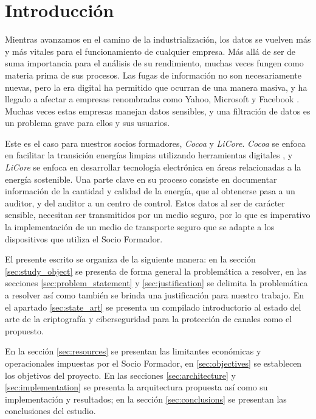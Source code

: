 \documentclass{article}
\begin{document}
    \section{Introducción}

        Mientras avanzamos en el camino de la industrialización, los datos se vuelven más y más vitales para el funcionamiento de cualquier empresa. Más allá de ser de suma importancia para el análisis de su rendimiento, muchas veces fungen como materia prima de sus procesos. Las fugas de información no son necesariamente nuevas, pero la era digital ha permitido que ocurran de una manera masiva, y ha llegado a afectar a empresas renombradas como Yahoo, Microsoft y Facebook \cite{data_breach_biggest}. Muchas veces estas empresas manejan datos sensibles, y una filtración de datos es un problema grave para ellos y sus usuarios.

        Este es el caso para nuestros socios formadores, \textit{Cocoa} y \textit{LiCore}. \textit{Cocoa} se enfoca en facilitar la transición energías limpias utilizando herramientas digitales \cite{cocoa}, y  \textit{LiCore} se enfoca en desarrollar tecnología electrónica en áreas relacionadas a la energía sostenible. Una parte clave en su proceso consiste en documentar información de la cantidad y calidad de la energía, que al obtenerse pasa a un auditor, y del auditor a un centro de control. Estos datos al ser de carácter sensible, necesitan ser transmitidos por un medio seguro, por lo que es imperativo la implementación de un medio de transporte seguro que se adapte a los dispositivos que utiliza el Socio Formador.

        El presente escrito se organiza de la siguiente manera: en la sección \ref{sec:study_object} se presenta de forma general la problemática a resolver, en las secciones \ref{sec:problem_statement} y \ref{sec:justification} se delimita la problemática a resolver así como también se brinda una justificación para nuestro trabajo. En el apartado \ref{sec:state_art} se presenta un compilado introductorio al estado del arte de la criptografía y ciberseguridad para la protección de canales como el propuesto.

        En la sección \ref{sec:resources} se presentan las limitantes económicas y operacionales impuestas por el Socio Formador, en \ref{sec:objectives} se establecen los objetivos del proyecto. En las secciones \ref{sec:architecture} y \ref{sec:implementation} se presenta la arquitectura propuesta así como su implementación y resultados; en la sección \ref{sec:conclusions} se presentan las conclusiones del estudio.
\end{document}
